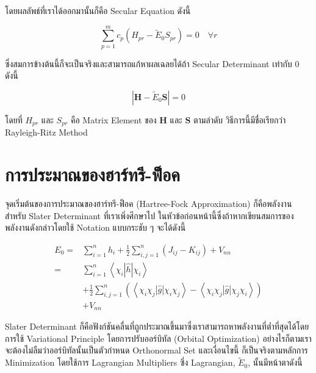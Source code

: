 \noindent โดยผลลัพธ์ที่เราได้ออกมานั้นก็คือ Secular Equation ดังนี้

\begin{equation}
    \sum_{p=1}^{m} c_{p} \left( H_{pr} - \tilde{E}_{0} S_{pr} \right) 
    = 0 \quad \forall r
\end{equation}

\noindent ซึ่งสมการข้างต้นนี้ก็จะเป็นจริงและสามารถแก้หาผลเฉลยได้ถ้า Secular Determinant เท่ากับ 0 ดังนี้

\begin{equation}
    |\boldsymbol{H} - \tilde{E}_{0} \boldsymbol{S}| = 0
\end{equation}

\noindent โดยที่ $H_{pr}$ และ $S_{pr}$ คือ Matrix Element ของ $\boldsymbol{H}$ และ $\boldsymbol{S}$ ตามลำดับ 
วิธีการนี้มีชื่อเรียกว่า Rayleigh-Ritz Method

\section{การประมาณของฮาร์ทรี-ฟ็อค}

จุดเริ่มต้นของการประมาณของฮาร์ทรี-ฟ็อค (Hartree-Fock Approximation) ก็คือพลังงานสำหรับ Slater Determinant ที่เราเพิ่งศึกษาไป%
ในหัวข้อก่อนหน้านี้ซึ่งถ้าหากเขียนสมการของพลังงานดังกล่าวโดยใช้ Notation แบบกระชับ ๆ จะได้ดังนี้

\begin{equation}
    \begin{aligned}
        \label{eq:energy_slater_determinant_compact}
        E_0 
        = & \sum_{i=1}^n h_i 
            + \frac{1}{2} \sum_{i, j=1}^n\left(J_{i j}-K_{i j}\right) 
            + V_{n n} \\
        = & \sum_{i=1}^n\left\langle\chi_i|\hat{h}| \chi_i\right\rangle \\
        & + \frac{1}{2} \sum_{i, j=1}^n\left(\left\langle\chi_i \chi_j|\hat{g}| \chi_i \chi_j\right\rangle 
            - \left\langle\chi_i \chi_j|\hat{g}| \chi_j \chi_i\right\rangle\right) \\
        & + V_{n n}
    \end{aligned}
\end{equation}

Slater Determinant ก็คือฟังก์ชันคลื่นที่ถูกประมาณขึ้นมาซึ่งเราสามารถหาพลังงานที่ต่ำที่สุดได้โดยการใช้ Variational Principle 
โดยการปรับออร์บิทัล (Orbital Optimization) อย่างไรก็ตามเราจะต้องไม่ลืมว่าออร์บิทัลนั้นเป็นตัวกำหนด Orthonormal Set และเงื่อนไขนี้%
ก็เป็นจริงตามหลักการ Minimization โดยใช้การ Lagrangian Multipliers ซึ่ง Lagrangian, $\tilde{E}_0$, นั้นมีหน้าตาดังนี้

